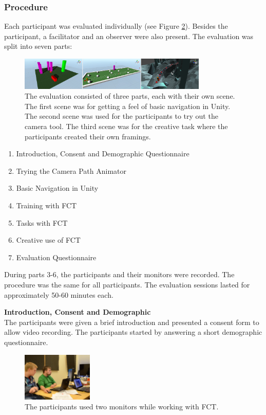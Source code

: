 \subsubsection{Procedure}
Each participant was evaluated individually (see Figure \ref{fig:tt}). Besides the participant, a facilitator and an observer were also present. The evaluation was split into seven parts: 
\begin{figure}[hbtp]
\centering
\includegraphics[width=0.8\textwidth]{Pics/sceneAll_horizontal}
\caption{The evaluation consisted of three parts, each with their own scene. The first scene was for getting a feel of basic navigation in Unity. The second scene was used for the participants to try out the camera tool. The third scene was for the creative task where the participants created their own framings.}
\label{fig:sceneAll}
\end{figure}

\begin{enumerate}
\item Introduction, Consent and Demographic Questionnaire
\item Trying the Camera Path Animator
\item Basic Navigation in Unity
\item Training with FCT
\item Tasks with FCT
\item Creative use of FCT
\item Evaluation Questionnaire
\end{enumerate}

During parts 3-6, the participants and their monitors were recorded. The procedure was the same for all participants. The evaluation sessions lasted for approximately 50-60 minutes each. 

\textbf{Introduction, Consent and Demographic}\\
The participants were given a brief introduction and presented a consent form to allow video recording. The participants started by answering a short demographic questionnaire. 

\begin{figure}[htbp]
\centering
\includegraphics[width=0.3\textwidth]{Pics/test_setup}
\caption{The participants used two monitors while working with FCT.}
\label{fig:tt}
\end{figure}


